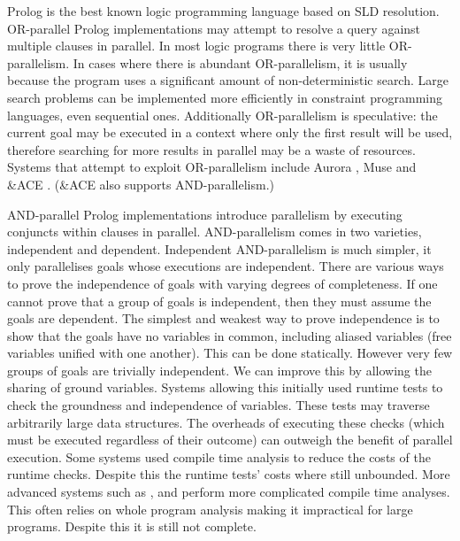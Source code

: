 Prolog is the best known logic programming language based on SLD
resolution.
OR-parallel Prolog implementations may attempt to resolve a query against
multiple clauses in parallel.
In most logic programs there is very little OR-parallelism.
In cases where there is abundant OR-parallelism,
it is usually because the program uses a significant amount of
non-deterministic search.
Large search problems can be implemented more efficiently in constraint
programming languages, even sequential ones.
Additionally OR-parallelism is speculative:
the current goal may be executed in a context where only the first result
will be used,
therefore searching for more results in parallel may be a waste of
resources.
Systems that attempt to exploit OR-parallelism include
Aurora \citep*{lusk:1990:aurora},
Muse \citep*{ali:1990:muse}
and \&ACE \citep*{gupta:1991:ace}.
(\&ACE also supports AND-parallelism.)

AND-parallel Prolog implementations introduce parallelism by executing
conjuncts within clauses in parallel.
AND-parallelism comes in two varieties, independent and dependent.
Independent AND-parallelism is much simpler, it only parallelises goals
whose executions are independent.
There are various ways to prove the independence of goals with varying
degrees of completeness.
If one cannot prove that a group of goals is independent,
then they must assume the goals are dependent.
The simplest and weakest way to prove independence is to show that the
goals have no variables in common,
including aliased variables (free variables unified with one another).
This can be done statically.
However very few groups of goals are trivially independent.
We can improve this by allowing the sharing of ground variables.
Systems allowing this initially used runtime tests to check the groundness
and independence of variables.
These tests may traverse arbitrarily large data structures.
The overheads of executing these checks
(which must be executed regardless of their outcome)
can outweigh the benefit of parallel execution.
Some systems used compile time analysis to reduce the costs of the runtime
checks.
Despite this the runtime tests' costs where still unbounded.
More advanced systems such as 
\citet{hermenegildo:1991:and-parallel},
\citet{DBLP:journals/tcs/GrasH09} and
\citet{Hermenegildo1995}
perform more complicated compile time analyses.
This often relies on whole program analysis 
making it impractical for large programs.
Despite this it is still not complete.

